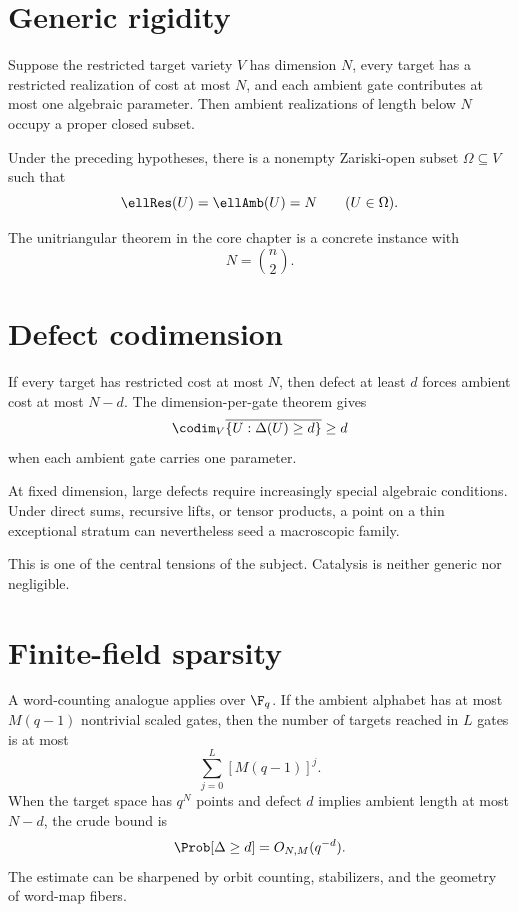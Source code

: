 \section{Generic rigidity}
Suppose the restricted target variety $V$ has dimension $N$, every target has a restricted realization of cost at most $N$, and each ambient gate contributes at most one algebraic parameter.  Then ambient realizations of length below $N$ occupy a proper closed subset.

\begin{theorem}
Under the preceding hypotheses, there is a nonempty Zariski-open subset $\Omega\subseteq V$ such that
\[
\ellRes(U)=\ellAmb(U)=N
\qquad(U\in\Omega).
\]
\end{theorem}
The unitriangular theorem in the core chapter is a concrete instance with
\[
N=\binom n2.
\]

\section{Defect codimension}
If every target has restricted cost at most $N$, then defect at least $d$ forces ambient cost at most $N-d$.  The dimension-per-gate theorem gives
\[
\codim_V\overline{\{U:\Delta(U)\ge d\}}
\ge d
\]
when each ambient gate carries one parameter.

\begin{principle}
At fixed dimension, large defects require increasingly special algebraic conditions.  Under direct sums, recursive lifts, or tensor products, a point on a thin exceptional stratum can nevertheless seed a macroscopic family.
\end{principle}

This is one of the central tensions of the subject.  Catalysis is neither generic nor negligible.

\section{Finite-field sparsity}
A word-counting analogue applies over $\F_q$.  If the ambient alphabet has at most $M(q-1)$ nontrivial scaled gates, then the number of targets reached in $L$ gates is at most
\[
\sum_{j=0}^L[M(q-1)]^j.
\]
When the target space has $q^N$ points and defect $d$ implies ambient length at most $N-d$, the crude bound is
\[
\Prob[\Delta\ge d]
=O_{N,M}(q^{-d}).
\]
The estimate can be sharpened by orbit counting, stabilizers, and the geometry of word-map fibers.

